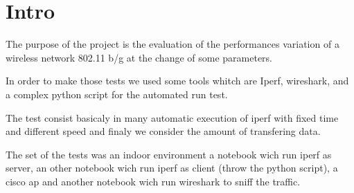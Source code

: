\documentclass[11pt]{amsart}
\begin{document}
\section{Intro}

The purpose of the project is the evaluation of the performances variation of a wireless network 802.11 b/g at the change of some parameters.

In order to make those tests we used some tools whitch are Iperf, wireshark, and a complex python script for the automated run test.

The test consist basicaly in many automatic execution of iperf with fixed time and different speed and finaly we consider the amount of transfering data.

The set of the tests was an indoor environment a notebook wich run iperf as server, an other notebook wich run iperf as client (throw the python script), a cisco ap and another notebook wich run wireshark to sniff the traffic.
\end{document}
